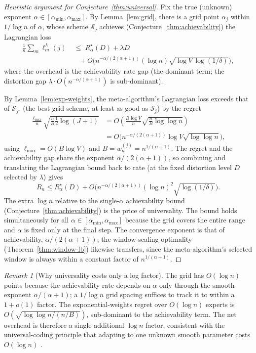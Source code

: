 \documentclass[11pt]{article}
\theoremstyle{plain}
\theoremstyle{definition}
\theoremstyle{remark}
\newtheorem{remark}[theorem]{Remark}
\begin{document}
\begin{proof}[Heuristic argument for Conjecture~\ref{thm:universal}]
Fix the true (unknown) exponent
$\alpha \in [\alpha_{\min}, \alpha_{\max}]$. By
Lemma~\ref{lem:grid}, there is a grid point $\alpha_j$ within
$1/\log n$ of $\alpha$, whose scheme $\mathcal{S}_j$ achieves
(Conjecture~\ref{thm:achievability}) the Lagrangian loss
\[
\begin{split}
\frac{1}{n}\sum_m \ell_m^\lambda(j)
&\;\leq\;
R^\star_\alpha(D) + \lambda D\\
&\quad + O\!\bigl(n^{-\alpha/(2(\alpha+1))}(\log n)\sqrt{\log V\,\log(1/\delta)}\bigr),
\end{split}
\]
where the overhead is the achievability rate gap (the dominant term;
the distortion gap $\lambda \cdot O(n^{-\alpha/(\alpha+1)})$ is
sub-dominant).

By Lemma~\ref{lem:exp-weights}, the meta-algorithm's Lagrangian loss
exceeds that of $\mathcal{S}_{j^\star}$ (the best grid scheme, at
least as good as $\mathcal{S}_j$) by the regret
\[
\begin{aligned}
\frac{\ell_{\max}}{n}\sqrt{\tfrac{n}{B}\tfrac{1}{2}\log(J+1)}
&= O\!\left(\frac{B\log V}{n}\sqrt{\tfrac{n}{B}\log\log n}\right) \\
&= O\!\bigl(n^{-\alpha/(2(\alpha+1))}\log V\sqrt{\log\log n}\bigr),
\end{aligned}
\]
using $\ell_{\max} = O(B\log V)$ and $B = w_n^{(j)} =
n^{1/(\alpha+1)}$. The regret and the achievability gap share the
exponent $\alpha/(2(\alpha+1))$, so combining and translating the
Lagrangian bound back to rate (at the fixed distortion level $D$
selected by $\lambda$) gives
\[
R_n \leq R^\star_\alpha(D)
   + O\!\bigl(n^{-\alpha/(2(\alpha+1))}(\log n)^2\sqrt{\log(1/\delta)}\bigr).
\]
The extra $\log n$ relative to the single-$\alpha$ achievability
bound (Conjecture~\ref{thm:achievability}) is the price of
universality. The bound holds simultaneously for all
$\alpha \in [\alpha_{\min}, \alpha_{\max}]$ because the grid covers
the entire range and $\alpha$ is fixed only at the final step.
The convergence exponent is that of achievability,
$\alpha/(2(\alpha+1))$; the window-scaling optimality
(Theorem~\ref{thm:window-lb}) likewise transfers, since the
meta-algorithm's selected window is always within a constant factor
of $n^{1/(\alpha+1)}$.
\end{proof}

\begin{remark}[Why universality costs only a log factor]
The grid has $O(\log n)$ points because the achievability rate
depends on $\alpha$ only through the smooth exponent
$\alpha/(\alpha+1)$; a $1/\log n$ grid spacing suffices to track it
to within a $1+o(1)$ factor. The exponential-weights regret over
$O(\log n)$ experts is $O(\sqrt{\log\log n / (n/B)})$, sub-dominant
to the achievability term. The net overhead is therefore a single
additional $\log n$ factor, consistent with the universal-coding
principle that adapting to one unknown smooth parameter costs
$O(\log n)$ \citep{rissanen1984universal}.
\end{remark}
\end{document}
